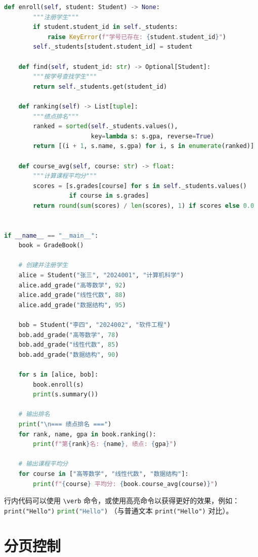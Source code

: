 \begin{longlisting}
\begin{lstlisting}[language=Python]
    def enroll(self, student: Student) -> None:
        """注册学生"""
        if student.student_id in self._students:
            raise KeyError(f"学号已存在: {student.student_id}")
        self._students[student.student_id] = student

    def find(self, student_id: str) -> Optional[Student]:
        """按学号查找学生"""
        return self._students.get(student_id)

    def ranking(self) -> List[tuple]:
        """绩点排名"""
        ranked = sorted(self._students.values(),
                        key=lambda s: s.gpa, reverse=True)
        return [(i + 1, s.name, s.gpa) for i, s in enumerate(ranked)]

    def course_avg(self, course: str) -> float:
        """计算课程平均分"""
        scores = [s.grades[course] for s in self._students.values()
                  if course in s.grades]
        return round(sum(scores) / len(scores), 1) if scores else 0.0


if __name__ == "__main__":
    book = GradeBook()

    # 创建并注册学生
    alice = Student("张三", "2024001", "计算机科学")
    alice.add_grade("高等数学", 92)
    alice.add_grade("线性代数", 88)
    alice.add_grade("数据结构", 95)

    bob = Student("李四", "2024002", "软件工程")
    bob.add_grade("高等数学", 78)
    bob.add_grade("线性代数", 85)
    bob.add_grade("数据结构", 90)

    for s in [alice, bob]:
        book.enroll(s)
        print(s.summary())

    # 输出排名
    print("\n=== 绩点排名 ===")
    for rank, name, gpa in book.ranking():
        print(f"第{rank}名: {name}, 绩点: {gpa}")

    # 输出课程平均分
    for course in ["高等数学", "线性代数", "数据结构"]:
        print(f"{course} 平均分: {book.course_avg(course)}")
\end{lstlisting}
\fi
\caption{跨页代码段示例（Python）}\label{listing:cross-page}
\end{longlisting}
\makeatother

行内代码可以使用 \verb|\verb| 命令，或使用高亮命令以获得更好的效果，例如：
\makeatletter
\iftongjithesis@minted
  \texttt{print("Hello")}
\else
  \lstinline[language=Python]{print("Hello")}
\fi
\makeatother
（与普通文本 \verb|print("Hello")| 对比）。

\section{分页控制}

